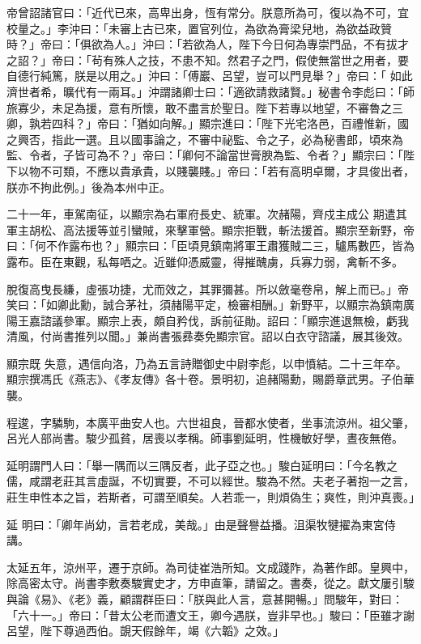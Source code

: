 \begin{pinyinscope}
 帝曾詔諸官曰：「近代已來，高卑出身，恆有常分。朕意所為可，復以為不可，宜校量之。」李沖曰：「未審上古已來，置官列位，為欲為膏梁兒地，為欲益政贊時？」帝曰：「俱欲為人。」沖曰：「若欲為人，陛下今日何為專崇門品，不有拔才之詔？」帝曰：「茍有殊人之技，不患不知。然君子之門，假使無當世之用者，要自德行純篤，朕是以用之。」沖曰：「傅巖、呂望，豈可以門見舉？」帝曰：「
 如此濟世者希，曠代有一兩耳。」沖謂諸卿士曰：「適欲請救諸賢。」秘書令李彪曰：「師旅寡少，未足為援，意有所懷，敢不盡言於聖日。陛下若專以地望，不審魯之三卿，孰若四科？」帝曰：「猶如向解。」顯宗進曰：「陛下光宅洛邑，百禮惟新，國之興否，指此一選。且以國事論之，不審中祕監、令之子，必為秘書郎，頃來為監、令者，子皆可為不？」帝曰：「卿何不論當世膏腴為監、令者？」顯宗曰：「陛下以物不可類，不應以貴承貴，以賤襲賤。」帝曰：「若有高明卓爾，才具俊出者，朕亦不拘此例。」後為本州中正。



 二十一年，車駕南征，以顯宗為右軍府長史、統軍。次赭陽，齊戍主成公
 期遣其軍主胡松、高法援等並引蠻賊，來擊軍營。顯宗拒戰，斬法援首。顯宗至新野，帝曰：「何不作露布也？」顯宗曰：「臣頃見鎮南將軍王肅獲賊二三，驢馬數匹，皆為露布。臣在東觀，私每哂之。近雖仰憑威靈，得摧醜虜，兵寡力弱，禽斬不多。



 脫復高曳長縑，虛張功捷，尤而效之，其罪彌甚。所以斂毫卷帛，解上而已。」帝笑曰：「如卿此勳，誠合茅社，須赭陽平定，檢審相酬。」新野平，以顯宗為鎮南廣陽王嘉諮議參軍。顯宗上表，頗自矜伐，訴前征勛。詔曰：「顯宗進退無檢，虧我清風，付尚書推列以聞。」兼尚書張彞奏免顯宗官。詔以白衣守諮議，展其後效。



 顯宗既
 失意，遇信向洛，乃為五言詩贈御史中尉李彪，以申憤結。二十三年卒。顯宗撰馮氏《燕志》、《孝友傳》各十卷。景明初，追赭陽勳，賜爵章武男。子伯華襲。



 程逡，字驎駒，本廣平曲安人也。六世祖良，晉都水使者，坐事流涼州。祖父肇，呂光人部尚書。駿少孤貧，居喪以孝稱。師事劉延明，性機敏好學，晝夜無倦。



 延明謂門人曰：「舉一隅而以三隅反者，此子亞之也。」駿白延明曰：「今名教之儒，咸謂老莊其言虛誕，不切實要，不可以經世。駿為不然。夫老子著抱一之言，莊生申性本之旨，若斯者，可謂至順矣。人若乖一，則煩偽生；爽性，則沖真喪。」



 延
 明曰：「卿年尚幼，言若老成，美哉。」由是聲譽益播。沮渠牧犍擢為東宮侍講。



 太延五年，涼州平，遷于京師。為司徒崔浩所知。文成踐阼，為著作郎。皇興中，除高密太守。尚書李敷奏駿實史才，方申直筆，請留之。書奏，從之。獻文屢引駿與論《易》、《老》義，顧謂群臣曰：「朕與此人言，意甚開暢。」問駿年，對曰：「六十一。」帝曰：「昔太公老而遭文王，卿今遇朕，豈非早也。」駿曰：「臣雖才謝呂望，陛下尊過西伯。覬天假餘年，竭《六韜》之效。」




\end{pinyinscope}

